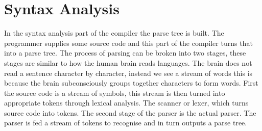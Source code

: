 \section{Syntax Analysis}\label{sec:syntaxAnalysis}
In the syntax analysis part of the compiler the parse tree is built.
The programmer supplies some source code and this part of the compiler turns that into a parse tree.
The process of parsing can be broken into two stages, these stages are similar to how the human brain reads languages.
The brain does not read a sentence character by character, instead we see a stream of words this is because the brain subconsciously groups together characters to form words.
First the source code is a stream of symbols, this stream is then turned into appropriate tokens through lexical analysis.
The scanner or lexer, which turns source code into tokens.
The second stage of the parser is the actual parser.
The parser is fed a stream of tokens to recognise and in turn outputs a parse tree.


